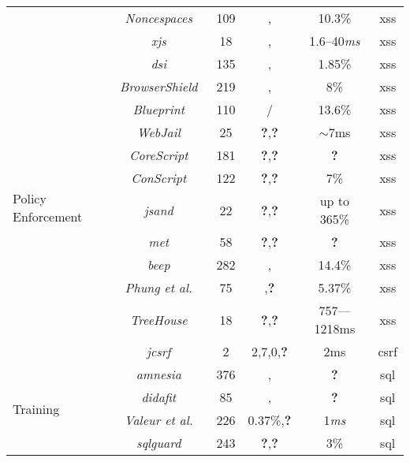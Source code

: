 \documentclass[conference]{IEEEtran}
\newcommand{\tick}{\ding{52}}
\newcommand{\xmark}{\ding{56}}
\begin{document}
\begin{table*}
\begin{threeparttable}
\begin{small}
{\begin{tabular}{l|c|c|cc|c}
	&  {\it Noncespaces}~\cite{GC09} & 109 & \tick,\tick &  10.3\% & {\sc xss} \\ 
    &  {\it x{\sc js}}~\cite{APKLM10} & 18 & \tick,\tick & 1.6--40{\it ms} & {\sc xss} \\
	\hline
	\hline    
	\multirow{12}{*}{Policy Enforcement}
	&  {\it {\sc dsi}}~\cite{NSS06} & 135 & \xmark,\xmark & 1.85\% & {\sc xss} \\ 
	&  {\it BrowserShield}~\cite{RDWDE07} & 219 & \tick,\tick & 8\% & {\sc xss} \\ 
	&  {\it Blueprint}~\cite{LV09} & 110 & \tick/\tick & 13.6\% & {\sc xss} \\ 
	&  {\it WebJail}~\cite{VDDPJ11} & 25 & {\bf ?},{\bf ?} & $\sim$7ms & {\sc xss} \\ 
	&  {\it CoreScript}~\cite{YCIS07} & 181 & {\bf ?},{\bf ?} &  {\bf ?} & {\sc xss} \\ 
	&  {\it ConScript}~\cite{ML10} & 122 & {\bf ?},{\bf ?} & 7\% & {\sc xss} \\
	&  {\it {\sc js}and}~\cite{AVBPDP12} & 22 & {\bf ?},{\bf ?} & up to 365\% & {\sc xss}\\
	&  {\it {\sc met}}~\cite{ELX07} & 58 & {\bf ?},{\bf ?} &  {\bf ?} & {\sc xss} \\ 
    &  {\it {\sc beep}}~\cite{TNH07} & 282 & \tick,\tick & 14.4\% & {\sc xss} \\
     &  {\it Phung et al.}~\cite{PSC09} & 75 & \xmark,{\bf ?} & 5.37\% & {\sc xss} \\
    &  {\it TreeHouse}~\cite{IW12} & 18 & {\bf ?},{\bf ?} & 757–--1218ms & {\sc xss} \\
    & {\it j{\sc csrf}}~\cite{PS11} & 2 & 2,7,0,{\bf ?} & 2ms & {\sc csrf} \\
	\hline
	\hline  
        \multirow{12}{*}{Training}
	&   {\it {\sc amnesia}}~\cite{HO05,HO06,HO05b} & 376 & \tick,\tick & {\bf ?} & {\sc sql} \\ 
	&   {\it {\sc didafit}}~\cite{LLW02} & 85 & \xmark,\xmark & {\bf ?} & {\sc sql} \\
	&   {\it Valeur et al.}~\cite{VMV05} & 226 & 0.37\%,{\bf ?} & 1{\it ms} & {\sc sql} \\
	& 	{\it {\sc sqlg}uard}~\cite{BWS05} & 243 & {\bf ?},{\bf ?} & 3\% & {\sc sql} \\

\end{tabular}}
\end{small}
\end{threeparttable}
\end{table*}
\end{document}
